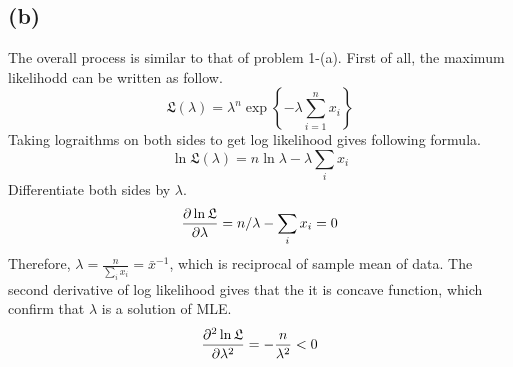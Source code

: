 \documentclass[10pt]{article}
\begin{document}
\subsection*{(b)}
The overall process is similar to that of problem 1-(a). First of all, the maximum likelihodd can be written as follow.
\begin{equation}
    \mathfrak{L}(\lambda) = \lambda^n \exp \left\{-\lambda \sum_{i=1}^n x_i\right\}
\end{equation}
Taking lograithms on both sides to get log likelihood gives following formula.
\begin{equation}
    \ln \mathfrak{L}(\lambda) = n\ln\lambda - \lambda \sum_i x_i
\end{equation}
Differentiate both sides by $\lambda$.
\begin{equation}
    {\partial \ln \mathfrak{L}\over \partial \lambda} = n/\lambda - \sum_i x_i = 0
\end{equation}
Therefore, $\lambda = \frac{n}{\sum_i x_i} = \bar{x}^{-1}$, which is reciprocal of sample mean of data.
The second derivative of log likelihood gives that the it is concave function, which confirm that $\lambda$ is a solution of MLE.
\begin{equation}
    {\partial^2 \ln\mathfrak{L} \over \partial \lambda^2} = -\frac{n}{\lambda^2} < 0
\end{equation}
\end{document}
